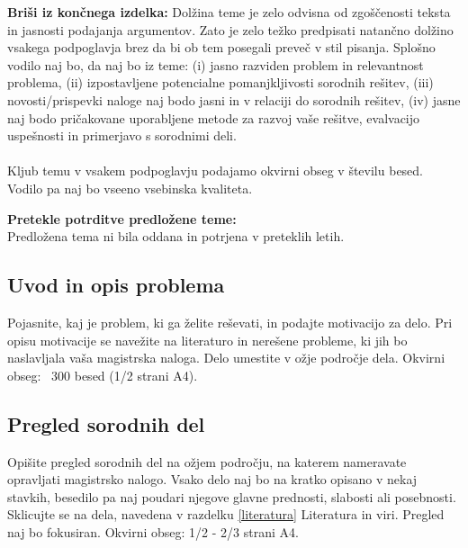 \documentclass[a4paper, 12pt]{article}
\newcommand\cmnt[1]{\textcolor{munsell}{#1}}
\begin{document}
\cmnt{
\textbf{Briši iz končnega izdelka:}
Dolžina teme je zelo odvisna od zgoščenosti teksta in jasnosti podajanja argumentov. Zato je zelo težko predpisati natančno dolžino vsakega podpoglavja brez da bi ob tem posegali preveč v stil pisanja. Splošno vodilo naj bo, da naj bo iz teme: (i) jasno razviden problem in relevantnost problema, (ii) izpostavljene potencialne pomanjkljivosti sorodnih rešitev, (iii) novosti/prispevki naloge naj bodo jasni in v relaciji do sorodnih rešitev, (iv) jasne naj bodo pričakovane uporabljene metode za razvoj vaše rešitve, evalvacijo uspešnosti in primerjavo s sorodnimi deli.
\\
\\
Kljub temu v vsakem podpoglavju podajamo okvirni obseg v številu besed. Vodilo pa naj bo vseeno vsebinska kvaliteta.}

\textbf{Pretekle potrditve predložene teme:}\\
Predložena tema ni bila oddana in potrjena v preteklih letih.

\subsection{Uvod in opis problema}

\cmnt{Pojasnite, kaj je problem, ki ga želite reševati, in podajte motivacijo za delo. Pri opisu motivacije se navežite na literaturo in nerešene probleme, ki jih bo naslavljala vaša magistrska naloga. Delo umestite v ožje področje dela. Okvirni obseg: ~300 besed (1/2 strani A4).}

\subsection{Pregled sorodnih del}

\cmnt{Opišite pregled sorodnih del na ožjem področju, na katerem nameravate opravljati magistrsko nalogo. Vsako delo naj bo na kratko opisano v nekaj stavkih, besedilo pa naj poudari njegove glavne prednosti, slabosti ali posebnosti. Sklicujte se na dela, navedena v razdelku \ref{literatura} Literatura in viri. Pregled naj bo fokusiran.  Okvirni obseg: 1/2 - 2/3 strani A4.}
\end{document}
